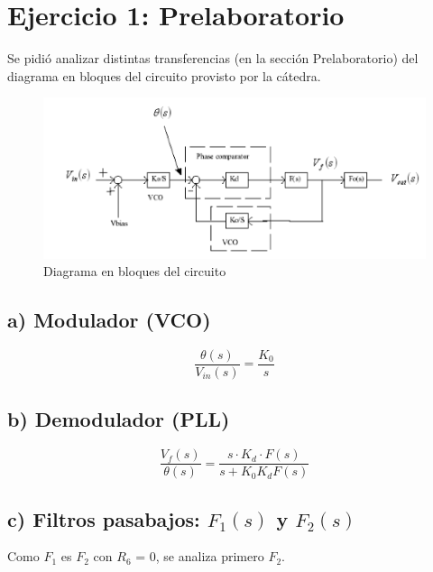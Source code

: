 \documentclass{article}
\begin{document}
\newgeometry{} %



\tableofcontents
\newpage

\section*{Ejercicio 1: Prelaboratorio}
Se pidió analizar distintas transferencias (en la sección Prelaboratorio) del diagrama en bloques del circuito provisto por la cátedra.
\begin{figure}[H]
\centering
\includegraphics[width=1\linewidth]{images/Circuito.PNG}
\caption{Diagrama en bloques del circuito}
\label{fig:Circuito}
\end{figure}

\subsection*{a) Modulador (VCO)}

\begin{equation} \label{mod_eqn}
\frac{\theta(s)}{V_{in}(s)} = \frac{K_0}{s}
\end{equation}

\subsection*{b) Demodulador (PLL)}

\begin{equation} \label{demod_eqn}
\frac{V_f(s)}{\theta(s)} = \frac{s\cdot K_d \cdot F(s)}{s+K_0K_dF(s)}
\end{equation}

\subsection*{c) Filtros pasabajos: $F_1(s)$ y $F_2(s)$}
Como $F_1$ es $F_2$ con $R_6$ = 0, se analiza primero $F_2$.
\end{document}
